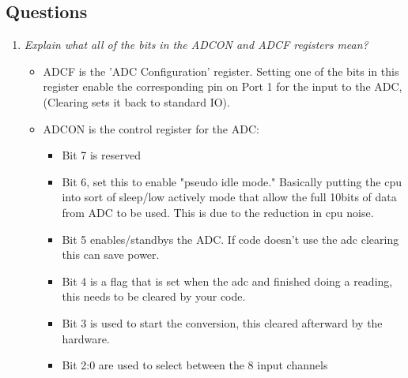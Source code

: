 \documentclass[11pt]{article}
\begin{document}
\begin{preview}
\section{Questions}
\begin{enumerate}
        \item \textit{Explain what all of the bits in the ADCON and ADCF registers mean?} \\
        \begin{itemize}
                \item ADCF is the 'ADC Configuration' register. Setting one of the bits in this register enable the corresponding pin on Port 1 for the input to the ADC, (Clearing sets it back to standard IO).
                \item ADCON is the control register for the ADC:
                \begin{itemize}
                        \item Bit 7 is reserved
                        \item Bit 6, set this to enable "pseudo idle mode." Basically putting the cpu into sort of sleep/low actively mode that allow the full 10bits of data from ADC to be used. This is due to the reduction in cpu noise.
                        \item Bit 5 enables/standbys the ADC. If code doesn't use the adc clearing this can save power.
                        \item Bit 4 is a flag that is set when the adc and finished doing a reading, this needs to be cleared by your code.
                        \item Bit 3 is used to start the conversion, this cleared afterward by the hardware.
                        \item Bit 2:0 are used to select between the 8 input channels
                \end{itemize} 
        \end{itemize}

\end{enumerate}

\end{preview}
\end{document}

